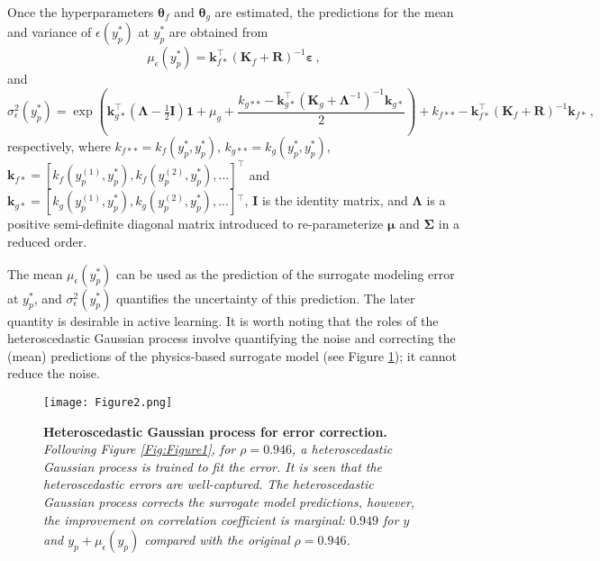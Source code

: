 \documentclass[number,preprint,3p]{elsarticle}
\def\tr{^\intercal}
\newcommand{\1}[2]{\mathbb{I}_{#1}\left(#2\right)}
\newcommand{\vect}[1]{\boldsymbol{#1}}
\begin{document}
	Once the hyperparameters $\vect{\theta}_{f}$ and $\vect{\theta}_{g}$ are estimated, the predictions for the mean and variance of $\epsilon(y_{p}^{\ast})$ at $y_{p}^{\ast}$ are obtained from \cite{lazaro2013retrieval}
	\begin{equation}\label{PredictionMean}
		\mu_{{\epsilon}}(y^{\ast}_{p})=\vect{k}_{f\ast}\tr(\vect{K}_{f}+\vect{R})^{-1}\vect{\varepsilon}\,,
	\end{equation}
	and
	\begin{equation}\label{PredictionSigma}
		\sigma_{{\epsilon}}^{2}(y_{p}^{\ast})=\exp\left(\vect{k}_{g\ast}\tr(\vect{\Lambda}-\tfrac{1}{2}\vect{I})\vect{1}+\mu_{g}+\frac{k_{g\ast\ast}-\vect{k}_{g\ast}\tr(\vect{K}_{g}+\vect{\Lambda}^{-1})^{-1}\vect{k}_{g\ast}}{2} \right)+k_{f\ast\ast}-\vect{k}_{f\ast}\tr(\vect{K}_{f}+\vect{R})^{-1}\vect{k}_{f\ast}\,,
	\end{equation}
	respectively, where $k_{f\ast\ast}=k_{f}(y_{p}^{\ast},y_{p}^{\ast})$, $k_{g\ast\ast}=k_{g}(y_{p}^{\ast},y_{p}^{\ast})$, $\vect{k}_{f\ast}=[k_{f}(y_{p}^{(1)},y_{p}^{\ast}),k_{f}(y_{p}^{(2)},y_{p}^{\ast}),...]\tr$ and $\vect{k}_{g\ast}=[k_{g}(y_{p}^{(1)},y_{p}^{\ast}),k_{g}(y_{p}^{(2)},y_{p}^{\ast}),...]{\tr}$, $\vect{I}$ is the identity matrix, and $\vect{\Lambda}$ is a positive semi-definite diagonal matrix introduced to re-parameterize $\vect{\mu}$ and $\vect{\Sigma}$ in a reduced order.
	
	The mean $\mu_{{\epsilon}}(y^{\ast}_{p})$ can be used as the prediction of the surrogate modeling error at $y_{p}^{\ast}$, and $\sigma_{{\epsilon}}^{2}(y_{p}^{\ast})$ quantifies the uncertainty of this prediction. The later quantity is desirable in active learning. It is worth noting that the roles of the heteroscedastic Gaussian process involve quantifying the noise and correcting the (mean) predictions of the physics-based surrogate model (see Figure \ref{Fig:Figure2}); it cannot reduce the noise. %
	
	\begin{figure}[H]
		\centering
		\texttt{[image: Figure2.png]}
		\caption{\textbf{Heteroscedastic Gaussian process for error correction.} \textit{Following Figure \ref{Fig:Figure1}, for $\rho=0.946$, a heteroscedastic Gaussian process is trained to fit the error. It is seen that the heteroscedastic errors are well-captured. The heteroscedastic Gaussian process corrects the surrogate model predictions, however, the improvement on correlation coefficient is marginal: $0.949$ for $y_{}$ and $y_{p}+\mu_{{\epsilon}}(y_{p})$ compared with the original $\rho=0.946$.}}
		\label{Fig:Figure2}
	\end{figure}
	
\end{document}
